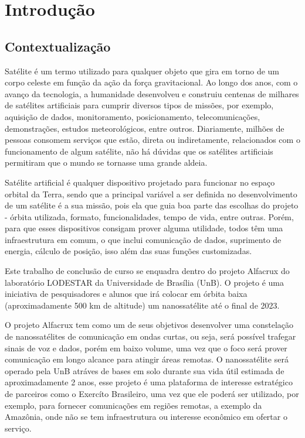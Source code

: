 \chapter{Introdução} \label{introducao}
\section{Contextualização}
Satélite é um termo utilizado para qualquer objeto que gira em torno de um corpo celeste em função da ação da força gravitacional. Ao longo dos anos, com o avanço da tecnologia, a humanidade desenvolveu e construiu centenas de milhares de satélites artificiais para cumprir diversos tipos de missões, por exemplo, aquisição de dados, monitoramento, posicionamento, telecomunicações, demonstrações, estudos meteorológicos, entre outros. Diariamente, milhões de pessoas consomem serviços que estão, direta ou indiretamente, relacionados com o funcionamento de algum satélite, não há dúvidas que os satélites artificiais permitiram que o mundo se tornasse uma grande aldeia.

Satélite artificial é qualquer dispositivo projetado para funcionar no espaço orbital da Terra, sendo que a principal variável a ser definida no desenvolvimento de um satélite é a sua missão, pois ela que guia boa parte das escolhas do projeto - órbita utilizada, formato, funcionalidades, tempo de vida, entre outras. Porém, para que esses dispositivos consigam prover alguma utilidade, todos têm uma infraestrutura em comum, o que inclui comunicação de dados, suprimento de energia, cálculo de posição, isso além das suas funções customizadas.\cite{nasa_comms_article} 

Este trabalho de conclusão de curso se enquadra dentro do projeto Alfacrux do laboratório LODESTAR da Universidade de Brasília (UnB). O projeto é uma iniciativa de pesquisadores e alunos que irá colocar em órbita baixa (aproximadamente 500 km de altitude) um nanossatélite até o final de 2023.

O projeto Alfacrux tem como um de seus objetivos desenvolver uma constelação de nanossatélites de comunicação em ondas curtas, ou seja, será possível trafegar sinais de voz e dados, porém em baixo volume, uma vez que o foco será prover comunicação em longo alcance para atingir áreas remotas. O nanossatélite será operado pela UnB atráves de bases em solo durante sua vida útil estimada de aproximadamente 2 anos, esse projeto é uma plataforma de interesse estratégico de parceiros como o Exercíto Brasileiro, uma vez que ele poderá ser utilizado, por exemplo, para fornecer comunicações em regiões remotas, a exemplo da Amazônia, onde não se tem infraestrutura ou interesse econômico em ofertar o serviço. 

